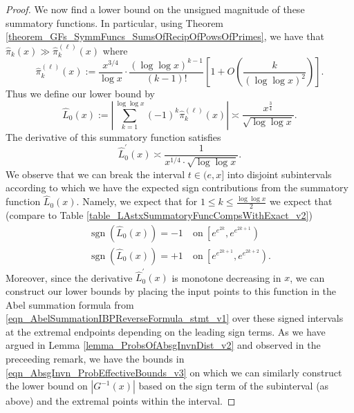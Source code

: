 \documentclass[11pt,reqno,a4letter]{article}
\numberwithin{figure}{section}
\numberwithin{table}{section}
\theoremstyle{plain}
\numberwithin{theorem}{section}
\theoremstyle{definition}
\begin{document}
\begin{proof}
We now find a lower bound on the unsigned magnitude of these summatory functions. 
In particular, using Theorem \ref{theorem_GFs_SymmFuncs_SumsOfRecipOfPowsOfPrimes}, 
we have that $\widehat{\pi}_k(x) \gg \widehat{\pi}_k^{(\ell)}(x)$ where 
\[
\widehat{\pi}_k^{(\ell)}(x) := \frac{x^{3/4}}{\log x} \cdot 
     \frac{(\log\log x)^{k-1}}{(k-1)!} \left[1 + 
     O\left(\frac{k}{(\log\log x)^2}\right)\right].
\]
Thus we define our lower bound by 
\[
\widehat{L}_0(x) := \left\lvert \sum_{k=1}^{\log\log x} (-1)^{k} \widehat{\pi}_k^{(\ell)}(x) \right\rvert 
     \asymp \frac{x^{\frac{3}{4}}}{\sqrt{\log\log x}}. 
\]
The derivative of this summatory function satisfies 
\[
\widehat{L}_0^{\prime}(x) \asymp \frac{1}{x^{1/4} \cdot \sqrt{\log\log x}}. 
\]
We observe that we can break the interval $t \in (e, x]$ into disjoint subintervals 
according to which we have the expected sign contributions from the 
summatory function $\widehat{L}_0(x)$. Namely, we expect that 
for $1 \leq k \leq \frac{\log\log x}{2}$ we expect that 
(compare to Table \ref{table_LAstxSummatoryFuncCompsWithExact_v2}) 
\begin{align*} 
\operatorname{sgn}\left(\widehat{L}_0(x)\right) = -1 & \mathrm{\ on\ } 
     \left[e^{e^{2k}}, e^{e^{2k+1}}\right) \\ 
\operatorname{sgn}\left(\widehat{L}_0(x)\right) = +1 & \mathrm{\ on\ } 
     \left[e^{e^{2k+1}}, e^{e^{2k+2}}\right). 
\end{align*} 
Moreover, since the derivative $\widehat{L}_0^{\prime}(x)$ is monotone decreasing in $x$, 
we can construct our lower bounds by placing the input points to this function 
in the Abel summation formula from 
\eqref{eqn_AbelSummationIBPReverseFormula_stmt_v1} 
over these signed intervals at the extremal endpoints depending on the leading sign terms. 
As we have argued in Lemma \ref{lemma_ProbsOfAbsgInvnDist_v2} and 
observed in the preceeding remark, we have the bounds in 
\eqref{eqn_AbsgInvn_ProbEffectiveBounds_v3} on which 
we can similarly construct the lower bound on $|G^{-1}(x)|$ based on the 
sign term of the subinterval (as above) and the extremal points within the interval. 


\end{proof}
\end{document}
